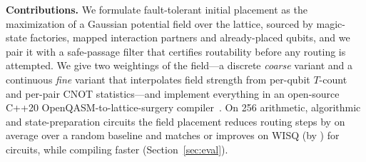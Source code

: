 \smallskip
\noindent\textbf{Contributions.}
We formulate fault-tolerant initial placement as the maximization of a Gaussian
potential field over the lattice, sourced by magic-state factories, mapped interaction
partners and already-placed qubits, and we pair it with a safe-passage filter
that certifies routability before any routing is attempted. We give two
weightings of the field---a discrete \emph{coarse} variant and a continuous
\emph{fine} variant that interpolates field strength from per-qubit $T$-count and
per-pair CNOT statistics---and implement everything in an open-source C++20
OpenQASM-to-lattice-surgery compiler~\cite{ftqc}. On 256 arithmetic,
algorithmic and state-preparation circuits the field placement reduces routing
steps by  on average over a random baseline and matches
or improves on WISQ (by ) for  circuits, 
while compiling  faster (Section~\ref{sec:eval}).
